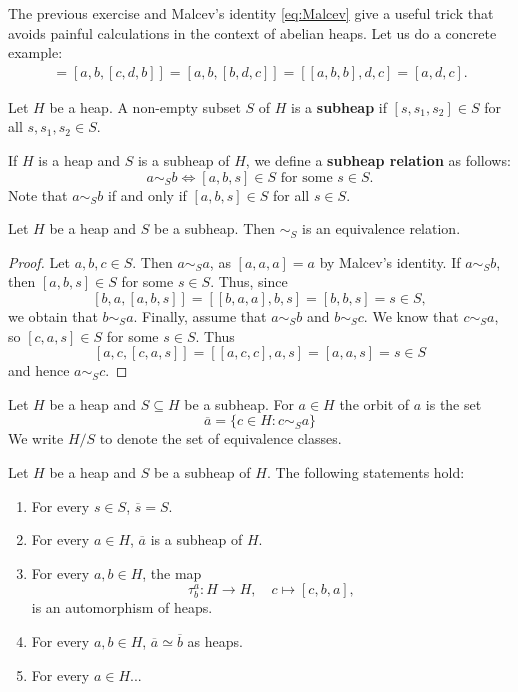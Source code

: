 \documentclass[graybox]{svmult}
\begin{document}
The previous exercise and Malcev's identity \eqref{eq:Malcev}
give a useful trick that avoids painful calculations in the context of abelian heaps. 
Let us do a concrete example:
\begin{align*}
    [a,b,c,d,b]=[a,b,[c,d,b]]=[a,b,[b,d,c]]=[[a,b,b],d,c]=[a,d,c].
\end{align*}

\begin{definition}
    Let $H$ be a heap. 
    A non-empty subset $S$ of $H$ is a \textbf{subheap} if $[s,s_1,s_2]\in S$ for all 
    $s,s_1,s_2\in S$. 
\end{definition}

If $H$ is a heap and $S$ is a subheap of $H$, we define 
a \textbf{subheap relation} as follows:
\[
a\sim_S b\Longleftrightarrow [a,b,s]\in S\text{ for some $s\in S$}.
\]
Note that $a\sim_Sb$ if and only if $[a,b,s]\in S$ for all $s\in S$. 

\begin{proposition}
    Let $H$ be a heap and $S$ be a subheap. Then $\sim_S$ is an equivalence relation. 
\end{proposition}

\begin{proof}
    Let $a,b,c\in S$. Then $a\sim_S a$, as $[a,a,a]=a$ by Malcev's identity. 
    If $a\sim_S b$, then $[a,b,s]\in S$ for some $s\in S$. Thus, since 
    \[
    [b,a,[a,b,s]]=[[b,a,a],b,s]=[b,b,s]=s\in S,
    \]
    we obtain that $b\sim_S a$. 
    Finally, assume that $a\sim_S b$ and $b\sim_S c$. We know that 
    $c\sim_S a$, so 
    $[c,a,s]\in S$ for some $s\in S$. Thus 
    \[
    [a,c,[c,a,s]]=[[a,c,c],a,s]=[a,a,s]=s\in S
    \]
    and hence $a\sim_S c$. 
\end{proof}

Let $H$ be a heap and $S\subseteq H$ be a subheap. For $a\in H$ 
the orbit of $a$ is the set
\[
\overline{a}=\{c\in H:c\sim_S a\}
\]
We write $H/S$ to denote the set
of equivalence classes.

\begin{theorem}
    Let $H$ be a heap and $S$ be a subheap of $H$. The following statements hold:
    \begin{enumerate}
        \item For every $s\in S$, $\overline{s}=S$. 
        \item For every $a\in H$, $\overline{a}$ is a subheap of $H$.
        \item For every $a,b\in H$, 
        the map
        \[
        \tau_b^a\colon H\to H,\quad
        c\mapsto [c,b,a],
        \]
        is an automorphism of heaps. 
        \item For every $a,b\in H$, 
        $\overline{a}\simeq\overline{b}$ as heaps. 
        \item For every $a\in H$...
    \end{enumerate}
\end{theorem}
\end{document}
